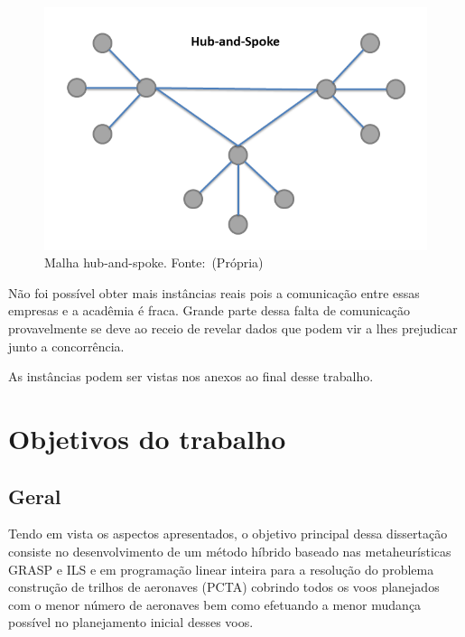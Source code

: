 \begin{figure}[ht]
\caption{Malha hub-and-spoke. \newline \mbox{Fonte: (Própria)}}
\label{fig:hubandspoke}
\includegraphics[scale=0.35]{./img/hubandspoke}
\end{figure}
 	 	
	
Não foi possível obter mais instâncias reais pois a comunicação entre essas
empresas e a acadêmia é fraca. Grande parte dessa falta de comunicação
provavelmente se deve ao receio de revelar dados que podem vir a lhes prejudicar
junto a concorrência.

As instâncias podem ser vistas nos anexos ao final desse trabalho.


\section {Objetivos do trabalho}


\subsection{Geral}
Tendo em vista os aspectos apresentados, o objetivo principal dessa dissertação
consiste no desenvolvimento de um método híbrido baseado nas metaheurísticas
GRASP e ILS e em programação linear inteira para a resolução do problema
construção de trilhos de aeronaves (PCTA) cobrindo todos os voos planejados com
o menor número de aeronaves bem como efetuando a menor mudança possível no
planejamento inicial desses voos. 

